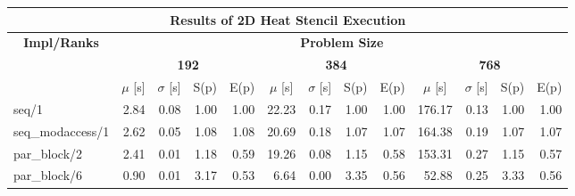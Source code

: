 
\begin{table}[H]
	\centering
	\footnotesize
	\begin{tabular}{|lllllllllllll|}
		\hline
		\multicolumn{13}{|c|}{\textbf{Results of 2D Heat Stencil Execution}} \\ \hline
		\multicolumn{1}{|c|}{\textbf{Impl/Ranks}} & \multicolumn{12}{c|}{\textbf{Problem Size}} \\ \hline
		\multicolumn{1}{|c|}{\textbf{}} & \multicolumn{4}{c|}{\textbf{192}} & \multicolumn{4}{c|}{\textbf{384}} & \multicolumn{4}{c|}{\textbf{768}} \\ \hline
		\multicolumn{1}{|l|}{} & \multicolumn{1}{c|}{$\mu$ [s]} & \multicolumn{1}{c|}{$\sigma$ [s]} & \multicolumn{1}{c|}{S(p)} & \multicolumn{1}{c|}{E(p)} & \multicolumn{1}{c|}{$\mu$ [s]} & \multicolumn{1}{c|}{$\sigma$ [s]} & \multicolumn{1}{c|}{S(p)} & \multicolumn{1}{c|}{E(p)} & \multicolumn{1}{c|}{$\mu$ [s]} & \multicolumn{1}{c|}{$\sigma$ [s]} & \multicolumn{1}{c|}{S(p)} & \multicolumn{1}{c|}{E(p)} \\ \hline
		\multicolumn{1}{|l|}{seq/1}  & \multicolumn{1}{r|}{2.84} & \multicolumn{1}{r|}{0.08} & \multicolumn{1}{r|}{1.00} & \multicolumn{1}{r|}{1.00}  & \multicolumn{1}{r|}{22.23} & \multicolumn{1}{r|}{0.17} & \multicolumn{1}{r|}{1.00} & \multicolumn{1}{r|}{1.00}  & \multicolumn{1}{r|}{176.17} & \multicolumn{1}{r|}{0.13} & \multicolumn{1}{r|}{1.00} & \multicolumn{1}{r|}{1.00}  \\ \hline
		\multicolumn{1}{|l|}{seq\_modaccess/1}  & \multicolumn{1}{r|}{2.62} & \multicolumn{1}{r|}{0.05} & \multicolumn{1}{r|}{1.08} & \multicolumn{1}{r|}{1.08}  & \multicolumn{1}{r|}{20.69} & \multicolumn{1}{r|}{0.18} & \multicolumn{1}{r|}{1.07} & \multicolumn{1}{r|}{1.07}  & \multicolumn{1}{r|}{164.38} & \multicolumn{1}{r|}{0.19} & \multicolumn{1}{r|}{1.07} & \multicolumn{1}{r|}{1.07}  \\ \hline
		\multicolumn{1}{|l|}{par\_block/2}  & \multicolumn{1}{r|}{2.41} & \multicolumn{1}{r|}{0.01} & \multicolumn{1}{r|}{1.18} & \multicolumn{1}{r|}{0.59}  & \multicolumn{1}{r|}{19.26} & \multicolumn{1}{r|}{0.08} & \multicolumn{1}{r|}{1.15} & \multicolumn{1}{r|}{0.58}  & \multicolumn{1}{r|}{153.31} & \multicolumn{1}{r|}{0.27} & \multicolumn{1}{r|}{1.15} & \multicolumn{1}{r|}{0.57}  \\ \hline
		\multicolumn{1}{|l|}{par\_block/6}  & \multicolumn{1}{r|}{0.90} & \multicolumn{1}{r|}{0.01} & \multicolumn{1}{r|}{3.17} & \multicolumn{1}{r|}{0.53}  & \multicolumn{1}{r|}{6.64} & \multicolumn{1}{r|}{0.00} & \multicolumn{1}{r|}{3.35} & \multicolumn{1}{r|}{0.56}  & \multicolumn{1}{r|}{52.88} & \multicolumn{1}{r|}{0.25} & \multicolumn{1}{r|}{3.33} & \multicolumn{1}{r|}{0.56}  \\ \hline

\end{tabular}
\end{table}
